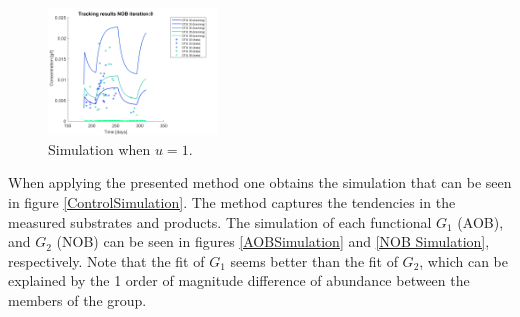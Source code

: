 \documentclass[3p,times]{elsarticle}
\begin{document}
\begin{figure}[h]
	\centering
	\includegraphics[width= 0.4\textwidth]{Application//191218_Reactor_A_NOB_Iter_0}
	\caption{Simulation when $u=1$. }
	\label{u=1_NOB}
\end{figure}
\pagebreak
When applying the presented method one obtains the simulation that can be seen in figure \ref{ControlSimulation}. The method captures the tendencies in the measured substrates and products. The simulation of each functional $G_1$ (AOB), and $G_2$ (NOB) can be seen in figures \ref{AOBSimulation} and \ref{NOB Simulation}, respectively. Note that the fit of $G_1$ seems better than the fit of $G_2$, which can be explained by the 1 order of magnitude difference of abundance between the members of the group.
\end{document}
